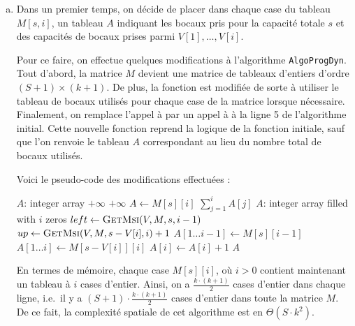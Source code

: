 \documentclass[12pt,a4paper]{article}
\begin{document}
\begin{enumerate}[a)]
 \item Dans un premier temps, on d\'ecide de placer dans chaque case du tableau $M[s,i]$, un tableau $A$ indiquant les bocaux pris pour la capacit\'e totale $s$ et des capacit\'es de bocaux prises parmi $V[1],\dotsc,V[i]$. 
 
 Pour ce faire, on effectue quelques modifications \`a l'algorithme \texttt{AlgoProgDyn}. Tout d'abord, la matrice $M$ devient une matrice de tableaux d'entiers d'ordre $(S+1) \times (k+1)$. De plus, la fonction  est modifi\'ee de sorte \`a utiliser le tableau de bocaux utilis\'es pour chaque case de la matrice lorsque n\'ecessaire. Finalement, on remplace l'appel \`a   par un appel \`a  \`a la ligne 5 de l'algorithme initial. Cette nouvelle fonction reprend la logique de la fonction  initiale, sauf que l'on renvoie le tableau $A$ correspondant au lieu du nombre total de bocaux utilis\'es. 
 
 Voici le pseudo-code des modifications effectu\'ees :
 
\clearpage
\begin{algorithm}
\begin{algorithmic}[1]
    \State $A$: integer array
        \State {}
        \State \Return $+\infty$
        \State \Return $+\infty$
    \Else
        \State $A \gets M[s][i]$
        \State \Return $\sum_{j=1}^{i} A[j]$
    \EndIf
\EndFunction
\Statex
{}
    \State $A$: integer array filled with $i$ zeros
        \State $left \gets \Call{GetMsi}{V, M, s, i-1}$
        \State $up \gets \Call{GetMsi}{V, M, s-V[i], i}+1$
            \State $A[1\dotsc i-1] \gets M[s][i-1]$
        \Else
            \State $A[1\dotsc i] \gets M[s-V[i]][i]$
            \State $A[i] \gets A[i] + 1$
        \EndIf
    \EndIf
    \State \Return $A$
\EndFunction
\end{algorithmic}
\end{algorithm}

En termes de m\'emoire, chaque case $M[s][i]$, o\`u $i > 0$ contient maintenant un tableau \`a $i$ cases d'entier. Ainsi, on a $\frac{k\cdot (k+1)}{2}$ cases d'entier dans chaque ligne, i.e.\ il y a $(S+1)\cdot \frac{k\cdot (k+1)}{2}$ cases d'entier dans toute la matrice $M$. De ce fait, la complexit\'e spatiale de cet algorithme est en $\Theta(S\cdot k^2)$.
 

\end{enumerate}
\end{document}
